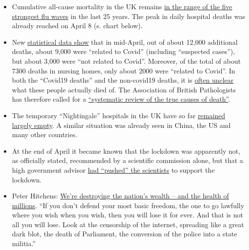\begin{itemize}
\tightlist
\item
  Cumulative all-cause mortality in the UK remains
  \href{http://inproportion2.talkigy.com/}{in the range of the five
  strongest flu waves} in the last 25 years. The peak in daily hospital
  deaths was already reached on April 8 (s. chart below).
\item
  New
  \href{https://www.telegraph.co.uk/politics/2020/05/01/evidence-rising-britains-lockdown-could-deadly-mistake/}{statistical
  data show} that in mid-April, out of about 12,000 additional deaths,
  about 9,000 were ``related to Covid'' (including ``suspected cases''),
  but about 3,000 were ``not related to Covid''. Moreover, of the total
  of about 7300 deaths in nursing homes, only about 2000 were ``related
  to Covid''. In both the ``Covid19 deaths'' and the non-covid19 deaths,
  it is
  \href{https://www.hsj.co.uk/commissioning/thousands-of-extra-deaths-outside-hospital-not-attributed-to-covid-19/7027459.article}{often
  unclear} what these people actually died of. The Association of
  British Pathologists has therefore called for a
  \href{https://www.hsj.co.uk/coronavirus/systematic-reviews-to-discover-true-cause-of-outbreak-deaths/7027491.article}{``systematic
  review of the true causes of death''}.
\item
  The temporary ``Nightingale'' hospitals in the UK have so far
  \href{https://www.telegraph.co.uk/news/0/do-many-nhs-nightingale-hospitals-remain-empty/}{remained
  largely empty}. A similar situation was already seen in China, the US
  and many other countries.
\item
  At the end of April it became known that the lockdown was apparently
  not, as officially stated, recommended by a scientific commission
  alone, but that a high government advisor
  \href{https://www.bloomberg.com/news/articles/2020-04-28/top-aide-to-u-k-s-johnson-pushed-scientists-to-back-lockdown}{had
  ``pushed'' the scientists} to support the lockdown.
\item
  Peter Hitchens:
  \href{https://hitchensblog.mailonsunday.co.uk/2020/05/peter-hitchens-were-destroying-the-nations-wealth-and-the-health-of-millions.html}{We're
  destroying the nation's wealth -- and the health of millions}. ``If
  you don't defend your most basic freedom, the one to go lawfully where
  you wish when you wish, then you will lose it for ever. And that is
  not all you will lose. Look at the censorship of the internet,
  spreading like a great dark blot, the death of Parliament, the
  conversion of the police into a state militia.''
\end{itemize}

